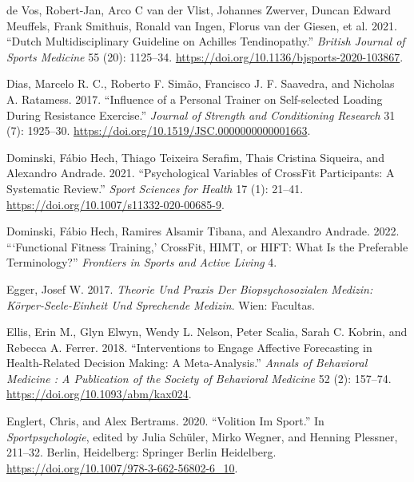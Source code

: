 \documentclass[
  letterpaper,
  DIV=11,
  numbers=noendperiod]{scrreprt}
\newlength{\cslhangindent}
\newenvironment{CSLReferences}[2] %
 {\begin{list}{}{%
  \setlength{\itemindent}{0pt}
  \setlength{\leftmargin}{0pt}
  \setlength{\parsep}{0pt}
  \ifodd #1
   \setlength{\leftmargin}{\cslhangindent}
   \setlength{\itemindent}{-1\cslhangindent}
  \fi
  \setlength{\itemsep}{#2\baselineskip}}}
 {\end{list}}
\begin{document}
\begin{CSLReferences}{1}{0}
de Vos, Robert-Jan, Arco C van der Vlist, Johannes Zwerver, Duncan
Edward Meuffels, Frank Smithuis, Ronald van Ingen, Florus van der
Giesen, et al. 2021. {``Dutch Multidisciplinary Guideline on {Achilles}
Tendinopathy.''} \emph{British Journal of Sports Medicine} 55 (20):
1125--34. \url{https://doi.org/10.1136/bjsports-2020-103867}.

Dias, Marcelo R. C., Roberto F. Simão, Francisco J. F. Saavedra, and
Nicholas A. Ratamess. 2017. {``Influence of a {Personal Trainer} on
{Self-selected Loading During Resistance Exercise}.''} \emph{Journal of
Strength and Conditioning Research} 31 (7): 1925--30.
\url{https://doi.org/10.1519/JSC.0000000000001663}.

Dominski, Fábio Hech, Thiago Teixeira Serafim, Thais Cristina Siqueira,
and Alexandro Andrade. 2021. {``Psychological Variables of {CrossFit}
Participants: A Systematic Review.''} \emph{Sport Sciences for Health}
17 (1): 21--41. \url{https://doi.org/10.1007/s11332-020-00685-9}.

Dominski, Fábio Hech, Ramires Alsamir Tibana, and Alexandro Andrade.
2022. {``{`{Functional Fitness Training},'} {CrossFit}, {HIMT}, or
{HIFT}: {What Is} the {Preferable Terminology}?''} \emph{Frontiers in
Sports and Active Living} 4.

Egger, Josef W. 2017. \emph{Theorie Und {Praxis} Der Biopsychosozialen
{Medizin}: {K{ö}rper-Seele-Einheit} Und Sprechende {Medizin}}. Wien:
Facultas.

Ellis, Erin M., Glyn Elwyn, Wendy L. Nelson, Peter Scalia, Sarah C.
Kobrin, and Rebecca A. Ferrer. 2018. {``Interventions to {Engage
Affective Forecasting} in {Health-Related Decision Making}: {A
Meta-Analysis}.''} \emph{Annals of Behavioral Medicine : A Publication
of the Society of Behavioral Medicine} 52 (2): 157--74.
\url{https://doi.org/10.1093/abm/kax024}.

Englert, Chris, and Alex Bertrams. 2020. {``Volition Im {Sport}.''} In
\emph{Sportpsychologie}, edited by Julia Schüler, Mirko Wegner, and
Henning Plessner, 211--32. Berlin, Heidelberg: Springer Berlin
Heidelberg. \url{https://doi.org/10.1007/978-3-662-56802-6_10}.


\end{CSLReferences}
\end{document}
